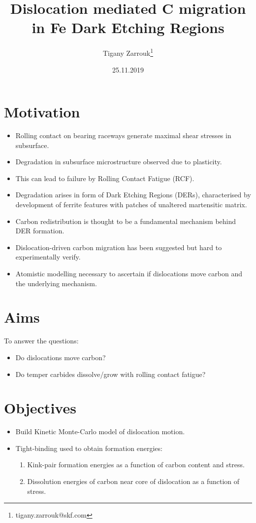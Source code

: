 \documentclass[11pt]{article}
\author{Tigany Zarrouk\thanks{tigany.zarrouk@skf.com}}
\date{25.11.2019}
\title{Dislocation mediated C migration in Fe Dark Etching Regions}
\begin{document}
\maketitle


\section*{Motivation}
\label{sec:orga348fc6}
\begin{itemize}
\item Rolling contact on bearing raceways generate maximal shear
stresses in subsurface.
\item Degradation in subsurface microstructure observed due to
plasticity.
\item This can lead to failure by Rolling Contact Fatigue (RCF).
\item Degradation arises in form of Dark Etching Regions (DERs),
characterised by development of ferrite features with patches of
unaltered martensitic matrix.
\item Carbon redistribution is thought to be a fundamental mechanism
behind DER formation.
\item Dislocation-driven carbon migration has been suggested but hard to
experimentally verify.
\item Atomistic modelling necessary to ascertain if dislocations move
carbon and the underlying mechanism.
\end{itemize}

\section*{Aims}
\label{sec:org74b04da}
To answer the questions:
\begin{itemize}
\item Do dislocations move carbon?
\item Do temper carbides dissolve/grow with rolling contact fatigue?
\end{itemize}



\section*{Objectives}
\label{sec:org7649f73}

\begin{itemize}
\item Build Kinetic Monte-Carlo model of dislocation motion.
\item Tight-binding used to obtain formation energies:
\begin{enumerate}
\item Kink-pair formation energies as a function of carbon content
and stress.
\item Dissolution energies of carbon near core of dislocation as a
function of stress.
\end{enumerate}
\end{itemize}
\end{document}
